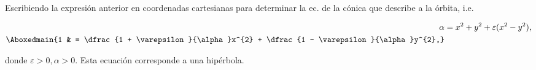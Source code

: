 \documentclass[../main.tex]{subfiles}
\begin{document}
Escribiendo la expresión anterior en coordenadas cartesianas
para determinar la ec. de la cónica que describe a la órbita, i.e.

\begin{align}
	\alpha        & = x^{2} + y^{2} + \varepsilon(x^{2} - y^{2}),                                   \\
	\Aboxedmain{1 & = \dfrac{1 + \varepsilon}{\alpha}x^{2} + \dfrac{1 - \varepsilon}{\alpha}y^{2},}
\end{align}

donde \(\varepsilon > 0, \alpha > 0\). Esta ecuación corresponde a
una hipérbola.
\end{document}
